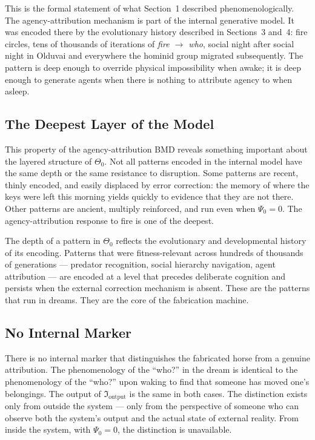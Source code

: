This is the formal statement of what Section~1 described phenomenologically. The agency-attribution mechanism is part of the internal generative model. It was encoded there by the evolutionary history described in Sections~3 and~4: fire circles, tens of thousands of iterations of \textit{fire $\rightarrow$ who}, social night after social night in Olduvai and everywhere the hominid group migrated subsequently. The pattern is deep enough to override physical impossibility when awake; it is deep enough to generate agents when there is nothing to attribute agency to when asleep.

\subsection{The Deepest Layer of the Model}

This property of the agency-attribution BMD reveals something important about the layered structure of $\Theta_0$. Not all patterns encoded in the internal model have the same depth or the same resistance to disruption. Some patterns are recent, thinly encoded, and easily displaced by error correction: the memory of where the keys were left this morning yields quickly to evidence that they are not there. Other patterns are ancient, multiply reinforced, and run even when $\Psi_0 = 0$. The agency-attribution response to fire is one of the deepest.

The depth of a pattern in $\Theta_0$ reflects the evolutionary and developmental history of its encoding. Patterns that were fitness-relevant across hundreds of thousands of generations --- predator recognition, social hierarchy navigation, agent attribution --- are encoded at a level that precedes deliberate cognition and persists when the external correction mechanism is absent. These are the patterns that run in dreams. They are the core of the fabrication machine.

\subsection{No Internal Marker}

There is no internal marker that distinguishes the fabricated horse from a genuine attribution. The phenomenology of the ``who?'' in the dream is identical to the phenomenology of the ``who?'' upon waking to find that someone has moved one's belongings. The output of $\mathfrak{I}_{\mathrm{output}}$ is the same in both cases. The distinction exists only from outside the system --- only from the perspective of someone who can observe both the system's output and the actual state of external reality. From inside the system, with $\Psi_0 = 0$, the distinction is unavailable.

